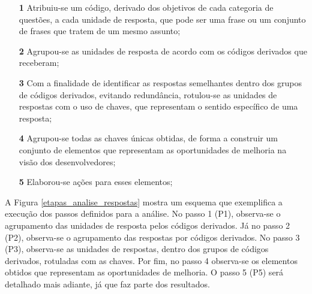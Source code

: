 \begin{enumerate}
	\item[\textbf{\llap{P}1}] Atribuiu-se um código, derivado dos objetivos de cada categoria de questões, a cada unidade de resposta, que pode ser uma frase ou um conjunto de frases que tratem de um mesmo assunto;
	\item[\textbf{\llap{P}2}] Agrupou-se as unidades de resposta de acordo com os códigos derivados que receberam;
	\item[\textbf{\llap{P}3}] Com a finalidade de identificar as respostas semelhantes dentro dos grupos de códigos derivados, evitando redundância, rotulou-se as unidades de respostas com o uso de chaves, que representam o sentido específico de uma resposta;
	\item[\textbf{\llap{P}4}] Agrupou-se todas as chaves únicas obtidas, de forma a construir um conjunto de elementos que representam as oportunidades de melhoria na visão dos desenvolvedores;
	\item[\textbf{\llap{P}5}] Elaborou-se ações para esses elementos;
\end{enumerate}

A Figura \ref{etapas_analise_respostas} mostra um esquema que exemplifica a execução dos passos definidos para a análise. No passo 1 (P1), observa-se o agrupamento das unidades de resposta pelos códigos derivados. Já no passo 2 (P2), observa-se o agrupamento das respostas por códigos derivados. No passo 3 (P3), observa-se as unidades de respostas, dentro dos grupos de códigos derivados, rotuladas com as chaves. Por fim, no passo 4 observa-se os elementos obtidos que representam as oportunidades de melhoria. O passo 5 (P5) será detalhado mais adiante, já que faz parte dos resultados.


